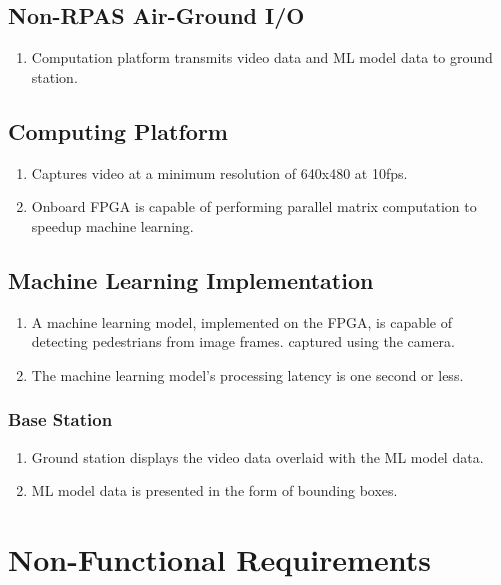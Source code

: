 \documentclass[10pt,letterpaper]{article}
\begin{document}
\subsection{Non-RPAS Air-Ground I/O}
\begin{enumerate}[{F.CM}.1:]
	\item Computation platform transmits video data and ML model data to ground station.
\end{enumerate}

\subsection{Computing Platform}
\begin{enumerate}[{F.CP}.1:]
	\item Captures video at a minimum resolution of 640x480 at 10fps.
	\item Onboard FPGA is capable of performing parallel matrix computation to speedup machine learning.
\end{enumerate}

\subsection{Machine Learning Implementation}
\begin{enumerate}[{F.ML}.1:]
\item A machine learning model, implemented on the FPGA, is capable of detecting pedestrians from image frames. captured using the camera.
\item The machine learning model's processing latency is one second or less.

\end{enumerate}

\subsubsection{Base Station}
\begin{enumerate}[{F.BS}.1:]
    \item Ground station displays the video data overlaid with the ML model data.
	\item ML model data is presented in the form of bounding boxes.
\end{enumerate}

\section{Non-Functional Requirements}\label{section:nonfuncrec}
\end{document}

